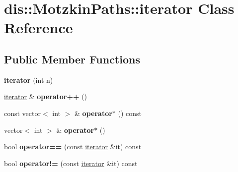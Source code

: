 \hypertarget{classdis_1_1_motzkin_paths_1_1iterator}{\section{dis\-:\-:Motzkin\-Paths\-:\-:iterator Class Reference}
\label{classdis_1_1_motzkin_paths_1_1iterator}
}
\subsection*{Public Member Functions}
\begin{DoxyCompactItemize}
\item 
\hypertarget{classdis_1_1_motzkin_paths_1_1iterator_a78fa8c089b805ace2f93c23ed8b80356}{{\bfseries iterator} (int n)}\label{classdis_1_1_motzkin_paths_1_1iterator_a78fa8c089b805ace2f93c23ed8b80356}

\item 
\hypertarget{classdis_1_1_motzkin_paths_1_1iterator_ad5721fd83281723151d3a0235d27f8ee}{\hyperlink{classdis_1_1_motzkin_paths_1_1iterator}{iterator} \& {\bfseries operator++} ()}\label{classdis_1_1_motzkin_paths_1_1iterator_ad5721fd83281723151d3a0235d27f8ee}

\item 
\hypertarget{classdis_1_1_motzkin_paths_1_1iterator_a1ae89ea0153f1c9e8807bb0d6d388c36}{const vector$<$ int $>$ \& {\bfseries operator$\ast$} () const }\label{classdis_1_1_motzkin_paths_1_1iterator_a1ae89ea0153f1c9e8807bb0d6d388c36}

\item 
\hypertarget{classdis_1_1_motzkin_paths_1_1iterator_a6d52fccb3b0e6e3a43bc3e59ccf123f8}{vector$<$ int $>$ \& {\bfseries operator$\ast$} ()}\label{classdis_1_1_motzkin_paths_1_1iterator_a6d52fccb3b0e6e3a43bc3e59ccf123f8}

\item 
\hypertarget{classdis_1_1_motzkin_paths_1_1iterator_adfbca9e9b163b8596bfa44f15f9c44e0}{bool {\bfseries operator==} (const \hyperlink{classdis_1_1_motzkin_paths_1_1iterator}{iterator} \&it) const }\label{classdis_1_1_motzkin_paths_1_1iterator_adfbca9e9b163b8596bfa44f15f9c44e0}

\item 
\hypertarget{classdis_1_1_motzkin_paths_1_1iterator_ab3994fd4e94d14d6aab878da6e31797c}{bool {\bfseries operator!=} (const \hyperlink{classdis_1_1_motzkin_paths_1_1iterator}{iterator} \&it) const }\label{classdis_1_1_motzkin_paths_1_1iterator_ab3994fd4e94d14d6aab878da6e31797c}

\end{DoxyCompactItemize}
